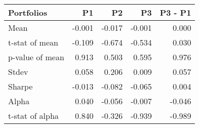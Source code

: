 \begin{tabular}{lrrrr}
\toprule
Portfolios & P1 & P2 & P3 & P3 - P1 \\
\midrule
Mean & -0.001 & -0.017 & -0.001 & 0.000 \\
t-stat of mean & -0.109 & -0.674 & -0.534 & 0.030 \\
p-value of mean & 0.913 & 0.503 & 0.595 & 0.976 \\
Stdev & 0.058 & 0.206 & 0.009 & 0.057 \\
Sharpe & -0.013 & -0.082 & -0.065 & 0.004 \\
Alpha & 0.040 & -0.056 & -0.007 & -0.046 \\
t-stat of alpha & 0.840 & -0.326 & -0.939 & -0.989 \\
\bottomrule
\end{tabular}
